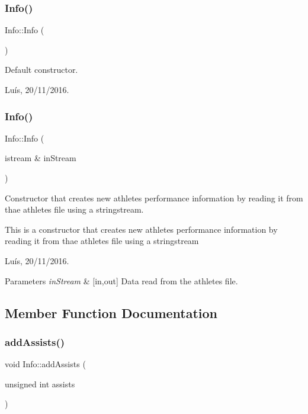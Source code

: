 \subsubsection{\texorpdfstring{Info()}{Info()}\hspace{0.1cm}{\footnotesize\ttfamily [3/4]}}
{\footnotesize\ttfamily Info\+::\+Info (\begin{DoxyParamCaption}{ }\end{DoxyParamCaption})}



Default constructor. 

Luís, 20/11/2016. \hypertarget{class_info_a45dbc59e7e008bcc1849f0260ea2d64f}{}\label{class_info_a45dbc59e7e008bcc1849f0260ea2d64f} 
\subsubsection{\texorpdfstring{Info()}{Info()}\hspace{0.1cm}{\footnotesize\ttfamily [4/4]}}
{\footnotesize\ttfamily Info\+::\+Info (\begin{DoxyParamCaption}\item[{istream \&}]{in\+Stream }\end{DoxyParamCaption})}



Constructor that creates new athlete\textquotesingle{}s performance information by reading it from thae athletes file using a stringstream. 

This is a constructor that creates new athlete\textquotesingle{}s performance information by reading it from thae athletes file using a stringstream

Luís, 20/11/2016. 


\begin{DoxyParams}{Parameters}
{\em in\+Stream} & \mbox{[}in,out\mbox{]} Data read from the athletes file. \\
\hline
\end{DoxyParams}


\subsection{Member Function Documentation}
\hypertarget{class_info_accd8e297dc18e19d498376a2532c4862}{}\label{class_info_accd8e297dc18e19d498376a2532c4862} 
\subsubsection{\texorpdfstring{add\+Assists()}{addAssists()}}
{\footnotesize\ttfamily void Info\+::add\+Assists (\begin{DoxyParamCaption}\item[{unsigned int}]{assists }\end{DoxyParamCaption})}



